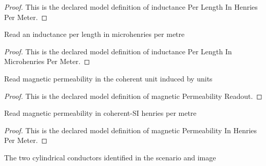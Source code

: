 \begin{proof}
  This is the declared model definition of inductance Per Length In Henries Per Meter.
\end{proof}
\begin{definition}
  \label{def:physics:phyx-mini-0885:phyxminiproblems-problemphyxmini0885-inductanceperlengthinmicrohenriespermeter}
  Read an inductance per length in microhenries per metre
\end{definition}
\begin{proof}
  This is the declared model definition of inductance Per Length In Microhenries Per Meter.
\end{proof}
\begin{definition}
  \label{def:physics:phyx-mini-0885:phyxminiproblems-problemphyxmini0885-magneticpermeabilityreadout}
  Read magnetic permeability in the coherent unit induced by units
\end{definition}
\begin{proof}
  This is the declared model definition of magnetic Permeability Readout.
\end{proof}
\begin{definition}
  \label{def:physics:phyx-mini-0885:phyxminiproblems-problemphyxmini0885-magneticpermeabilityinhenriespermeter}
  Read magnetic permeability in coherent-SI henries per metre
\end{definition}
\begin{proof}
  This is the declared model definition of magnetic Permeability In Henries Per Meter.
\end{proof}
\begin{definition}
  \label{def:physics:phyx-mini-0885:phyxminiproblems-problemphyxmini0885-cableconductor}
  The two cylindrical conductors identified in the scenario and image
\end{definition}
